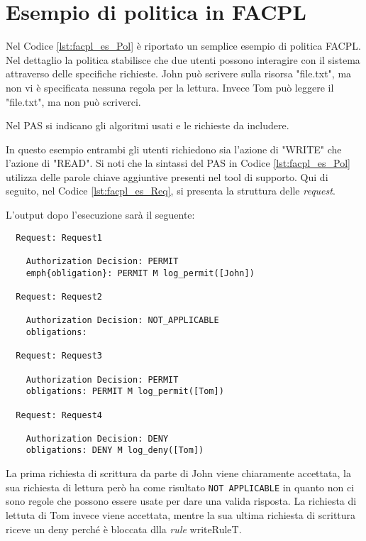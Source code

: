 \section{Esempio di politica in FACPL}
\label{sec:Esempio_FACPL}
Nel Codice \ref{lst:facpl_es_Pol} è riportato un semplice esempio di politica \ac{FACPL}.
Nel dettaglio la politica stabilisce che due utenti possono interagire con il sistema attraverso delle specifiche richieste.
John può scrivere sulla risorsa "file.txt", ma non vi è specificata nessuna regola per la lettura. Invece Tom può
leggere il "file.txt", ma non può scriverci.\par

Nel \ac{PAS} si indicano gli algoritmi usati e le richieste da includere.\par
In questo esempio entrambi gli utenti richiedono sia l'azione di "WRITE" che l'azione di "READ". Si noti che la sintassi del
\ac{PAS} in Codice \ref{lst:facpl_es_Pol} utilizza delle parole chiave aggiuntive presenti nel tool di supporto.
Qui di seguito, nel Codice \ref{lst:facpl_es_Req}, si presenta la struttura delle \emph{request}.

L'output dopo l'esecuzione sarà il seguente:
\begin{verbatim}
  Request: Request1

    Authorization Decision: PERMIT
    emph{obligation}: PERMIT M log_permit([John])

  Request: Request2

    Authorization Decision: NOT_APPLICABLE
    obligations:

  Request: Request3

    Authorization Decision: PERMIT
    obligations: PERMIT M log_permit([Tom])

  Request: Request4

    Authorization Decision: DENY
    obligations: DENY M log_deny([Tom])
\end{verbatim}
La prima richiesta di scrittura da parte di John viene chiaramente accettata, la sua richiesta di lettura però ha
come risultato \texttt{NOT APPLICABLE} in quanto non ci sono regole che possono essere usate per dare una valida risposta.
La richiesta di lettuta di Tom invece viene accettata, mentre la sua ultima richiesta di scrittura riceve un deny
perché è bloccata dlla \emph{rule} writeRuleT.\par
